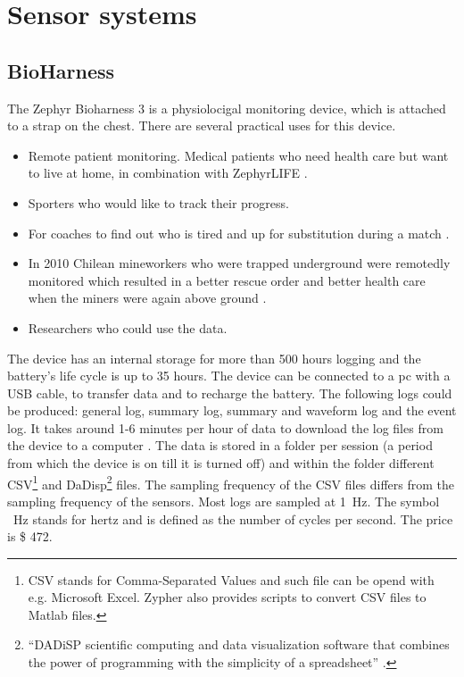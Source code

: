 \section{Sensor systems}
	\label{sec:sensorsystems}
	\subsection{BioHarness}
			The Zephyr Bioharness 3 \cite{bioharness} is a physiolocigal monitoring device, which is attached to a strap on the chest. There are several practical uses for this device.
			\begin{itemize}
				\item Remote patient monitoring. Medical patients who need health care but want to live at home, in combination with ZephyrLIFE \texttrademark \cite{bhpatients}.
				\item Sporters who would like to track their progress.
				\item For coaches to find out who is tired and up for substitution during a match \cite{bhsport}.
				\item In 2010 Chilean mineworkers who were trapped underground were remotedly monitored which resulted in a better rescue order and better health care when the miners were again above ground \cite{chile}.
				\item Researchers who could use the data.
			\end{itemize}

			The device has an internal storage for more than 500 hours logging and the battery's life cycle is up to 35 hours. The device can be connected to a pc with a USB cable, to transfer data and to recharge the battery. The following logs could be produced: general log, summary log, summary and waveform log and the event log. 
			It takes around 1-6 minutes per hour of data to download the log files from the device to a computer \cite{bhdatasheet}. The data is stored in a folder per session (a period from which the device is on till it is turned off) and within the folder different CSV\footnote{CSV stands for Comma-Separated Values and such file can be opend with e.g. Microsoft Excel. Zypher also provides scripts to convert CSV files to Matlab files.} and DaDisp\footnote{``DADiSP scientific computing and data visualization software that combines the power of programming with the simplicity of a spreadsheet'' \cite{dadisp}.} files. The sampling frequency of the CSV files differs from the sampling frequency of the sensors. Most logs are sampled at \SI{1}{\hertz}. The symbol \SI{}{\hertz} stands for hertz and is defined as the number of cycles per second. The price is \$ 472.
		
